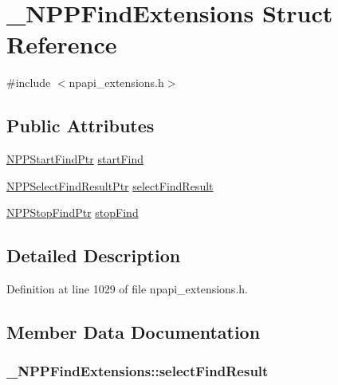 \hypertarget{struct___n_p_p_find_extensions}{
\section{\_\-NPPFindExtensions Struct Reference}
\label{struct___n_p_p_find_extensions}
}


{\ttfamily \#include $<$npapi\_\-extensions.h$>$}

\subsection*{Public Attributes}
\begin{DoxyCompactItemize}
\item 
\hyperlink{npapi__extensions_8h_a83120f743e8de769e389550822523f51}{NPPStartFindPtr} \hyperlink{struct___n_p_p_find_extensions_a81b270222f796f8df0dc7cf771c854bb}{startFind}
\item 
\hyperlink{npapi__extensions_8h_af3581e5704f4303fdb93ed502f59a9f5}{NPPSelectFindResultPtr} \hyperlink{struct___n_p_p_find_extensions_a34f28c41eb8e73fd5c16aeffb5aa1938}{selectFindResult}
\item 
\hyperlink{npapi__extensions_8h_a79111add50d7429acdfa26ad0a55e4ae}{NPPStopFindPtr} \hyperlink{struct___n_p_p_find_extensions_a86a735fce593c126bd79a5cabf8cccfe}{stopFind}
\end{DoxyCompactItemize}


\subsection{Detailed Description}


Definition at line 1029 of file npapi\_\-extensions.h.



\subsection{Member Data Documentation}
\hypertarget{struct___n_p_p_find_extensions_a34f28c41eb8e73fd5c16aeffb5aa1938}{
\subsubsection[{selectFindResult}]{ {\bf \_\-NPPFindExtensions::selectFindResult}}}
\label{struct___n_p_p_find_extensions_a34f28c41eb8e73fd5c16aeffb5aa1938}


